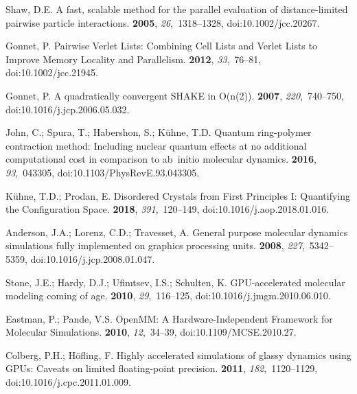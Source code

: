 \documentclass[computation,article,accept,moreauthors,pdftex]{Definitions/mdpi}
\begin{document}
\begin{thebibliography}{999}
Shaw, D.E.
\newblock A fast, scalable method for the parallel evaluation of
 distance-limited pairwise particle interactions.
 {\bf 2005}, {\em 26},~1318--1328, doi:10.1002/jcc.20267.

Gonnet, P.
\newblock Pairwise Verlet Lists: Combining Cell Lists and Verlet Lists to
 Improve Memory Locality and Parallelism.
 {\bf 2012}, {\em 33},~76--81, doi:10.1002/jcc.21945.

Gonnet, P.
\newblock A quadratically convergent SHAKE in O(n(2)).
 {\bf 2007}, {\em 220},~740--750, doi:10.1016/j.jcp.2006.05.032.

John, C.; Spura, T.; Habershon, S.; K\"uhne, T.D.
\newblock Quantum ring-polymer contraction method: Including nuclear quantum
 effects at no additional computational cost in comparison to ab~initio
 molecular dynamics.
 {\bf 2016}, {\em 93},~043305, doi:10.1103/PhysRevE.93.043305.

K\"uhne, T.D.; Prodan, E.
\newblock Disordered Crystals from First Principles I: Quantifying the
 Configuration Space.
 {\bf 2018}, {\em 391},~120--149, doi:10.1016/j.aop.2018.01.016.

Anderson, J.A.; Lorenz, C.D.; Travesset, A.
\newblock General purpose molecular dynamics simulations fully implemented on
 graphics processing units.
 {\bf 2008}, {\em 227},~5342--5359, doi:10.1016/j.jcp.2008.01.047.

Stone, J.E.; Hardy, D.J.; Ufimtsev, I.S.; Schulten, K.
\newblock GPU-accelerated molecular modeling coming of age.
 {\bf 2010}, {\em 29},~116--125, doi:10.1016/j.jmgm.2010.06.010.

Eastman, P.; Pande, V.S.
\newblock OpenMM: A Hardware-Independent Framework for Molecular Simulations.
 {\bf 2010}, {\em 12},~34--39, doi:10.1109/MCSE.2010.27.

Colberg, P.H.; H\"ofling, F.
\newblock Highly accelerated simulations of glassy dynamics using GPUs: Caveats
 on limited floating-point precision.
 {\bf 2011}, {\em 182},~1120--1129, doi:10.1016/j.cpc.2011.01.009.


\end{thebibliography}
\end{document}
